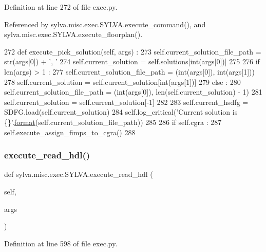 Definition at line 272 of file exec.\+py.



Referenced by sylva.\+misc.\+exec.\+S\+Y\+L\+V\+A.\+execute\+\_\+command(), and sylva.\+misc.\+exec.\+S\+Y\+L\+V\+A.\+execute\+\_\+floorplan().


\begin{DoxyCode}
272   \textcolor{keyword}{def }execute\_pick\_solution(self, args) :
273     self.current\_solution\_file\_path = str(args[0]) + \textcolor{stringliteral}{', '}
274     self.current\_solution = self.solutions[int(args[0])]
275 
276     \textcolor{keywordflow}{if} len(args) > 1 :
277       self.current\_solution\_file\_path = (int(args[0]), int(args[1]))
278       self.current\_solution = self.current\_solution[int(args[1])]
279     \textcolor{keywordflow}{else} :
280       self.current\_solution\_file\_path = (int(args[0]), len(self.current\_solution) - 1)
281       self.current\_solution = self.current\_solution[-1]
282 
283     self.current\_hsdfg = SDFG.load(self.current\_solution)
284     self.log\_critical(\textcolor{stringliteral}{'Current solution is \{\}'}.\hyperlink{namespacesylva_1_1examples_1_1hsdfg_ab3510a0b8457362330aa4d9fd2209590}{format}(self.current\_solution\_file\_path))
285 
286     \textcolor{keywordflow}{if} self.cgra :
287       self.execute\_assign\_fimps\_to\_cgra()
288 
\end{DoxyCode}
\mbox{\label{classsylva_1_1misc_1_1exec_1_1_s_y_l_v_a_a6b4351626d411764ca605cdc23158f60}} 
\subsubsection{\texorpdfstring{execute\+\_\+read\+\_\+hdl()}{execute\_read\_hdl()}}
{\footnotesize\ttfamily def sylva.\+misc.\+exec.\+S\+Y\+L\+V\+A.\+execute\+\_\+read\+\_\+hdl (\begin{DoxyParamCaption}\item[{}]{self,  }\item[{}]{args }\end{DoxyParamCaption})}



Definition at line 598 of file exec.\+py.



